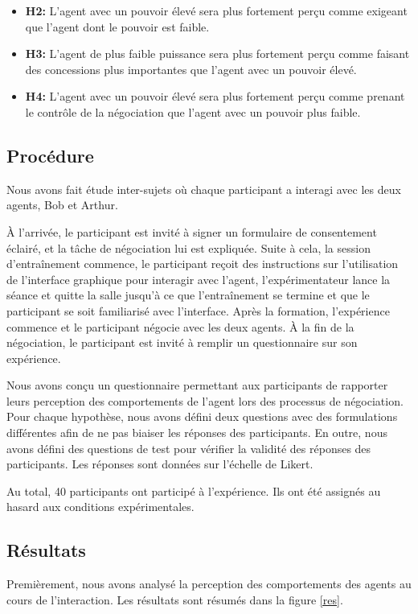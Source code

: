 {\begin{itemize}
				\item \textbf {H2:} L'agent avec un pouvoir élevé sera plus fortement perçu comme exigeant que l'agent dont le pouvoir est faible.
				
				\item \textbf {H3:} L'agent de plus faible puissance sera plus fortement perçu comme faisant des concessions plus importantes que l'agent  avec un pouvoir élevé.
				
				\item \textbf {H4:} L'agent  avec un pouvoir élevé sera plus fortement perçu comme prenant le contrôle de la négociation que l'agent avec un pouvoir plus faible.
			
			\end{itemize}

			\subsection{Procédure}
			
			Nous avons fait étude inter-sujets où chaque participant a interagi avec les deux agents, Bob et Arthur.
			
			À l'arrivée, le participant est invité à signer un formulaire de consentement éclairé, et  la tâche de négociation lui est expliquée. 
			Suite à cela, la  session d'entraînement commence, le participant reçoit des instructions sur l'utilisation de l'interface graphique pour interagir avec l'agent, l'expérimentateur lance la séance et quitte la salle jusqu'à ce que l'entraînement se termine et que le participant se soit familiarisé avec l'interface.
			 Après la formation, l'expérience commence et le participant négocie avec les deux agents. À la fin de la négociation, le participant est invité à remplir un questionnaire sur son expérience.
			
			Nous avons conçu un questionnaire permettant aux participants de rapporter leurs perception des comportements de l'agent lors des processus de négociation. Pour chaque hypothèse, nous avons défini deux questions avec des formulations différentes afin de ne pas biaiser les réponses des participants. En outre, nous avons défini des questions de test pour vérifier la validité des réponses des participants. Les réponses sont données sur l'échelle de Likert.
			
			Au total, 40 participants ont participé à l'expérience. Ils ont été assignés au hasard aux conditions expérimentales.
			
			\subsection{Résultats}
				Premièrement, nous avons analysé la perception des comportements des agents au cours de l'interaction. Les résultats sont résumés dans la figure \ref{res}.
				
}

